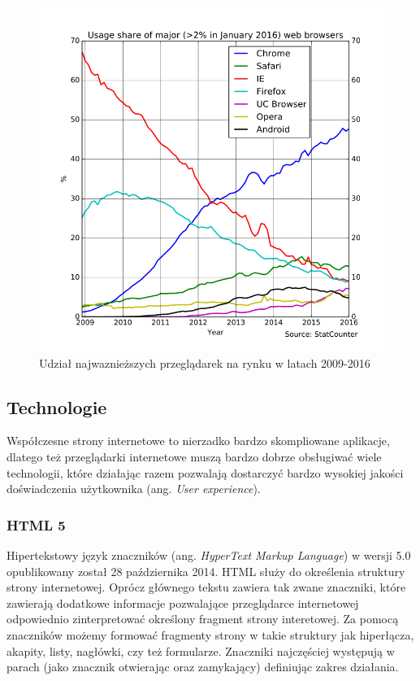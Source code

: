 \documentclass[polish, twoside, 12pt]{mwart}
\begin{document}
\begin{figure}[ht]
    \includegraphics[width=\textwidth]{web-browers-usage-share.png}
	\caption{Udział najwaznieższych przeglądarek na rynku w latach 2009-2016}
	\label{figure1}
\end{figure}

\subsection{Technologie}

Współczesne strony internetowe to nierzadko bardzo skompliowane aplikacje, dlatego też przeglądarki internetowe muszą bardzo dobrze obsługiwać wiele technologii, które działając razem pozwalają dostarczyć bardzo wysokiej jakości doświadczenia użytkownika (ang. \emph{User experience}). 

\subsubsection{HTML 5}

Hipertekstowy język znaczników (ang. \emph{HyperText Markup Language}) w wersji 5.0 opublikowany został 28 października 2014. HTML służy do określenia struktury strony internetowej. Oprócz głównego tekstu zawiera tak zwane znaczniki, które zawierają dodatkowe informacje pozwalające przeglądarce internetowej odpowiednio zinterpretować określony fragment strony interetowej. Za pomocą znaczników możemy formować fragmenty strony w takie struktury jak hiperłącza, akapity, listy, nagłówki, czy też formularze. Znaczniki najczęściej występują w parach (jako znacznik otwierając oraz zamykający) definiując zakres działania.
\end{document}
